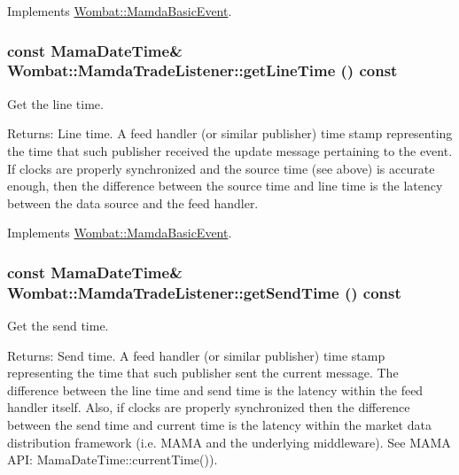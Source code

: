 Implements \hyperlink{classWombat_1_1MamdaBasicEvent_b3810afc69474ef3b192ee4c9307e714}{Wombat::Mamda\-Basic\-Event}.\hypertarget{classWombat_1_1MamdaTradeListener_1bdc7c259fc34f4e4e43e2e97953ba97}{
\subsubsection[getLineTime]{\setlength{\rightskip}{0pt plus 5cm}const Mama\-Date\-Time\& Wombat::Mamda\-Trade\-Listener::get\-Line\-Time () const}}
\label{classWombat_1_1MamdaTradeListener_1bdc7c259fc34f4e4e43e2e97953ba97}


Get the line time. 

\begin{Desc}
\item[Returns:]Line time. A feed handler (or similar publisher) time stamp representing the time that such publisher received the update message pertaining to the event. If clocks are properly synchronized and the source time (see above) is accurate enough, then the difference between the source time and line time is the latency between the data source and the feed handler. \end{Desc}


Implements \hyperlink{classWombat_1_1MamdaBasicEvent_3fcc26fa1a6446bcec12b11ac74ed26d}{Wombat::Mamda\-Basic\-Event}.\hypertarget{classWombat_1_1MamdaTradeListener_db49cd3341a07e0659b16b6166d56c3a}{
\subsubsection[getSendTime]{\setlength{\rightskip}{0pt plus 5cm}const Mama\-Date\-Time\& Wombat::Mamda\-Trade\-Listener::get\-Send\-Time () const}}
\label{classWombat_1_1MamdaTradeListener_db49cd3341a07e0659b16b6166d56c3a}


Get the send time. 

\begin{Desc}
\item[Returns:]Send time. A feed handler (or similar publisher) time stamp representing the time that such publisher sent the current message. The difference between the line time and send time is the latency within the feed handler itself. Also, if clocks are properly synchronized then the difference between the send time and current time is the latency within the market data distribution framework (i.e. MAMA and the underlying middleware). See MAMA API: Mama\-Date\-Time::current\-Time()). \end{Desc}


